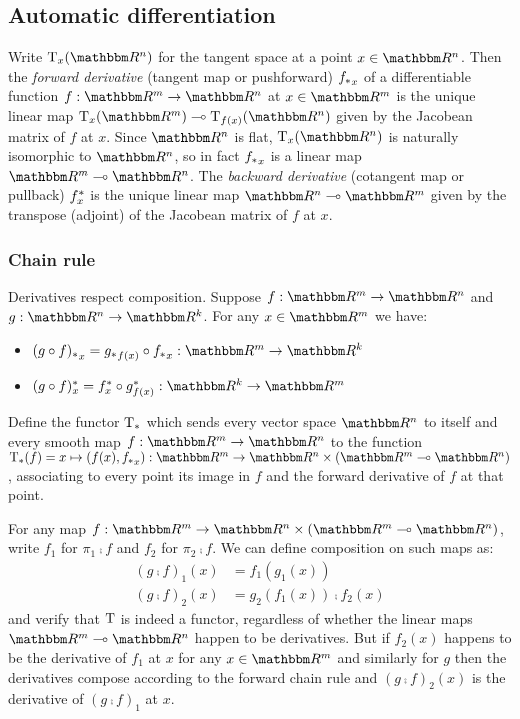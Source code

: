 \subsection{Automatic differentiation}

Write $\tangents_x(\RR^n)$ for the tangent space at a point $x \in \RR^n$. Then the \emph{forward derivative}
(tangent map or pushforward) ${f_{*}}_x$ of a differentiable function $f: \RR^m \to \RR^n$ at $x \in \RR^m$
is the unique linear map $\tangents_x(\RR^m) \linearto \tangents_{f(x)}(\RR^n)$ given by the Jacobean matrix
of $f$ at $x$. Since $\RR^n$ is flat, $\tangents_x(\RR^n)$ is naturally isomorphic to $\RR^n$, so in fact
${f_{*}}_x$ is a linear map $\RR^m \linearto \RR^n$. The \emph{backward derivative} (cotangent map or
pullback) $f^{*}_x$ is the unique linear map $\RR^n \linearto \RR^m$ given by the transpose (adjoint) of
the Jacobean matrix of $f$ at $x$.

\subsubsection{Chain rule}

Derivatives respect composition. Suppose $f: \RR^m \to \RR^n$ and $g: \RR^n \to \RR^k$. For any $x \in \RR^m$
we have:

\begin{itemize}
\item $\pushf{(g \comp f)}_x = \pushf{g}_{f(x)} \comp \pushf{f}_x: \RR^m \to \RR^k$
\item $\pullf{(g \comp f)}_x = \pullf{f}_{x} \comp \pullf{g}_{f(x)}: \RR^k \to \RR^m$
\end{itemize}

\begin{definition}
Define the functor $\mathrm{T}_*$ which sends every vector space $\RR^n$ to itself and every smooth map $f:
\RR^m \to \RR^n$ to the function $\tangents_*(f) = x \mapsto (f(x), \pushf{f}_x): \RR^m \to \RR^n \times (\RR^m
\linearto \RR^n)$, associating to every point its image in $f$ and the forward derivative of $f$ at that
point.
\end{definition}

For any map $f: \RR^m \to \RR^n \times (\RR^m \linearto \RR^n)$, write $f_1$ for $\pi_1 \comp f$ and $f_2$ for
$\pi_2 \comp f$. We can define composition on such maps as:
\begin{align*}
(g \comp f)_1(x) &= f_1(g_1(x)) \\
(g \comp f)_2(x) &= g_2(f_1(x)) \comp f_2(x)
\end{align*}
\noindent and verify that $\mathrm{T}$ is indeed a functor, regardless of whether the linear maps $\RR^m
\linearto \RR^n$ happen to be derivatives. But if $f_2(x)$ happens to be the derivative of $f_1$ at $x$ for
any $x \in \RR^m$ and similarly for $g$ then the derivatives compose according to the forward chain rule and
$(g \comp f)_2(x)$ is the derivative of $(g \comp f)_1$ at $x$.

